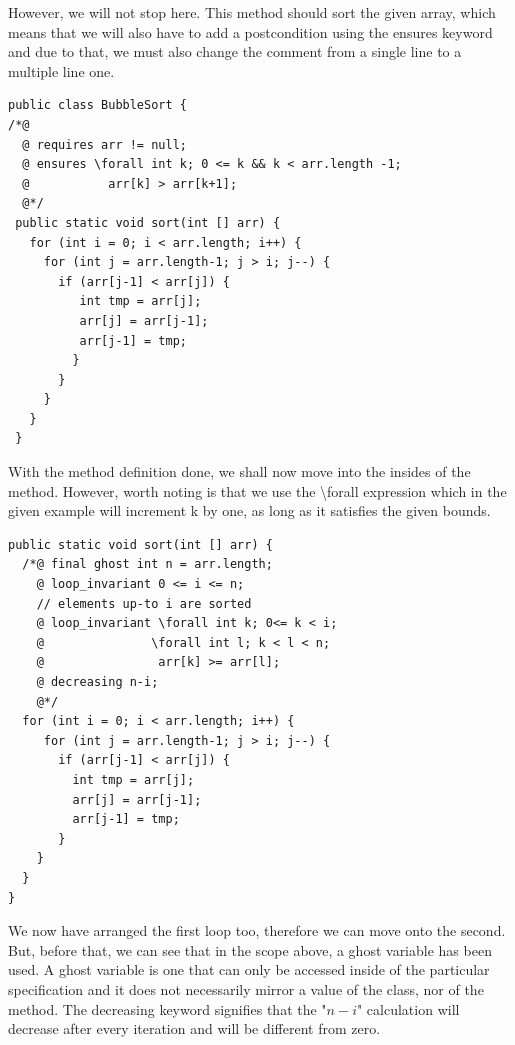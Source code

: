 \documentclass{beamer}
\begin{document}
\begin{frame}{}
However, we will not stop here. This method should sort the given array, which means that we will also have to add a postcondition using the ensures keyword and due to that, we must also change the comment from a single line to a multiple line one.
\end{frame}

\begin{frame}[fragile]{}
\begin{lstlisting}[basicstyle=\footnotesize]
public class BubbleSort {    
/*@
  @ requires arr != null; 
  @ ensures \forall int k; 0 <= k && k < arr.length -1;
  @           arr[k] > arr[k+1];
  @*/
 public static void sort(int [] arr) {        
   for (int i = 0; i < arr.length; i++) {
     for (int j = arr.length-1; j > i; j--) {
       if (arr[j-1] < arr[j]) {
          int tmp = arr[j];
          arr[j] = arr[j-1];
          arr[j-1] = tmp;
         }
       }
     }
   }
 }
\end{lstlisting}
\end{frame}

\begin{frame}{}
With the method definition done, we shall now move into the insides of the method. However, worth noting is that we use the \textbackslash forall expression which in the given example will increment k by one, as long as it satisfies the given bounds.
\end{frame}

\begin{frame}[fragile]{}
\begin{lstlisting}[]
public static void sort(int [] arr) {        
  /*@ final ghost int n = arr.length;   
    @ loop_invariant 0 <= i <= n;
    // elements up-to i are sorted
    @ loop_invariant \forall int k; 0<= k < i; 
    @               \forall int l; k < l < n; 
    @                arr[k] >= arr[l];
    @ decreasing n-i;
    @*/
  for (int i = 0; i < arr.length; i++) {
     for (int j = arr.length-1; j > i; j--) {
       if (arr[j-1] < arr[j]) {
         int tmp = arr[j];
         arr[j] = arr[j-1];
         arr[j-1] = tmp;
       }
    }
  }
}
\end{lstlisting}
\end{frame}

\begin{frame}{}
We now have arranged the first loop too, therefore we can move onto the second. But, before that, we can see that in the scope above, a ghost variable has been used. A ghost variable is one that can only be accessed inside of the particular specification and it does not necessarily mirror a value of the class, nor of the method. The decreasing keyword signifies that the "$n-i$" calculation will decrease after every iteration and will be different from zero.
\end{frame}
\end{document}
